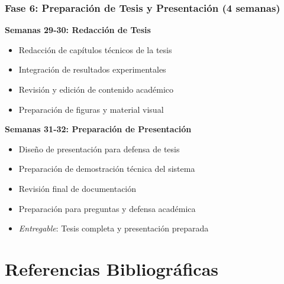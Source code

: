 \documentclass[12pt,a4paper]{article}
\begin{document}
\subsubsection{Fase 6: Preparación de Tesis y Presentación (4 semanas)}

\textbf{Semanas 29-30: Redacción de Tesis}
\begin{itemize}
    \item Redacción de capítulos técnicos de la tesis
    \item Integración de resultados experimentales
    \item Revisión y edición de contenido académico
    \item Preparación de figuras y material visual
\end{itemize}

\textbf{Semanas 31-32: Preparación de Presentación}
\begin{itemize}
    \item Diseño de presentación para defensa de tesis
    \item Preparación de demostración técnica del sistema
    \item Revisión final de documentación
    \item Preparación para preguntas y defensa académica
    \item \textit{Entregable}: Tesis completa y presentación preparada
\end{itemize}

\section{Referencias Bibliográficas}
\end{document}
